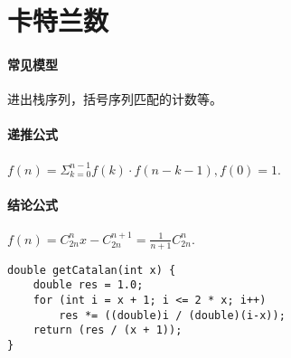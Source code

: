 \section{卡特兰数}

\paragraph{常见模型} 进出栈序列，括号序列匹配的计数等。
\paragraph{递推公式} $f(n)=\Sigma_{k=0}^{n-1}f(k) \cdot f(n-k-1), f(0)=1$.
\paragraph{结论公式}$f(n)=C^{n}_{2n}x - C^{n+1}_{2n} = \frac{1}{n+1}C_{2n}^{n}$.

\begin{verbatim}
double getCatalan(int x) {
    double res = 1.0;
    for (int i = x + 1; i <= 2 * x; i++)
        res *= ((double)i / (double)(i-x));
    return (res / (x + 1));
}
\end{verbatim}